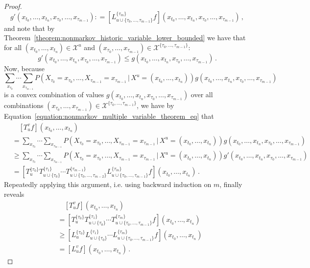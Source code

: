 \documentclass[a4paper,reqno]{amsart}
\newcommand{\states}{\mathcal{X}}
\newcommand{\coloneqq}{:\!=}
\begin{document}
\begin{proof}
\begin{equation*}
g'(x_{t_0},\ldots,x_{t_n},x_{\tau_0},\ldots,x_{\tau_{m-1}}) \coloneqq \left[L_{u\cup\{\tau_0,\ldots,\tau_{m-1}\}}^{\{\tau_m\}}f\right](x_{t_0},\ldots,x_{t_n},x_{\tau_0},\ldots,x_{\tau_{m-1}})\,,
\end{equation*}
and note that by Theorem~\ref{theorem:nonmarkov_historic_variable_lower_bounded} we have that for all $(x_{t_0},\ldots,x_{t_n})\in\states^u$ and $(x_{\tau_0},\ldots,x_{\tau_{m-1}})\in\states^{\{\tau_0,\ldots,\tau_{m-1}\}}$:
\begin{equation}\label{equation:nonmarkov_multiple_variable_theorem_eq}
g'(x_{t_0},\ldots,x_{t_n},x_{\tau_0},\ldots,x_{\tau_{m-1}}) \leq g(x_{t_0},\ldots,x_{t_n},x_{\tau_0},\ldots,x_{\tau_{m-1}})\,.
\end{equation}
Now, because
\begin{equation*}
\sum_{x_{\tau_0}}\cdots\sum_{x_{\tau_{m-1}}} P\left(X_{\tau_0}=x_{\tau_0},\ldots,X_{\tau_{m-1}}=x_{\tau_{m-1}}\,\vert\,X^u=(x_{t_0},\ldots,x_{t_n})\right)g(x_{t_0},\ldots,x_{t_n},x_{\tau_0},\ldots,x_{\tau_{m-1}})
\end{equation*}
is a convex combination of values $g(x_{t_0},\ldots,x_{t_n},x_{\tau_0},\ldots,x_{\tau_{m-1}})$ over all combinations $(x_{\tau_0},\ldots,x_{\tau_{m-1}})\in\states^{\{\tau_0,\ldots,\tau_{m-1}\}}$, we have by Equation~\ref{equation:nonmarkov_multiple_variable_theorem_eq} that
\begin{align*}
&\quad \left[T_u^vf\right](x_{t_0},\ldots,x_{t_n}) \\
&= \sum_{x_{\tau_0}}\cdots\sum_{x_{\tau_{m-1}}} P\left(X_{\tau_0}=x_{\tau_0},\ldots,X_{\tau_{m-1}}=x_{\tau_{m-1}}\,\vert\,X^u=(x_{t_0},\ldots,x_{t_n})\right)g(x_{t_0},\ldots,x_{t_n},x_{\tau_0},\ldots,x_{\tau_{m-1}}) \\
&\geq \sum_{x_{\tau_0}}\cdots\sum_{x_{\tau_{m-1}}} P\left(X_{\tau_0}=x_{\tau_0},\ldots,X_{\tau_{m-1}}=x_{\tau_{m-1}}\,\vert\,X^u=(x_{t_0},\ldots,x_{t_n})\right)g'(x_{t_0},\ldots,x_{t_n},x_{\tau_0},\ldots,x_{\tau_{m-1}}) \\
&= \left[T_u^{\{\tau_0\}}T_{u\cup\{\tau_0\}}^{\{\tau_1\}}\cdots T_{u\cup\{\tau_0,\ldots,\tau_{m-2}\}}^{\{\tau_{m-1}\}}L_{u\cup\{\tau_0,\ldots,\tau_{m-1}\}}^{\{\tau_m\}} f\right](x_{t_0},\ldots,x_{t_n})\,.
\end{align*}
Repeatedly applying this argument, i.e. using backward induction on $m$, finally reveals
\begin{align*}
&\quad \left[T_u^vf\right](x_{t_0},\ldots,x_{t_n}) \\
 &= \left[T_u^{\{\tau_0\}}T_{u\cup\{\tau_0\}}^{\{\tau_1\}}\cdots T_{u\cup\{\tau_0,\ldots,\tau_{m-1}\}}^{\{\tau_m\}} f\right](x_{t_0},\ldots,x_{t_n}) \\
 &\geq \left[L_u^{\{\tau_0\}}L_{u\cup\{\tau_0\}}^{\{\tau_1\}}\cdots L_{u\cup\{\tau_0,\ldots,\tau_{m-1}\}}^{\{\tau_m\}} f\right](x_{t_0},\ldots,x_{t_n}) \\
 &= \left[L_u^v f\right](x_{t_0},\ldots,x_{t_n})\,.
\end{align*}
\end{proof}
\end{document}
